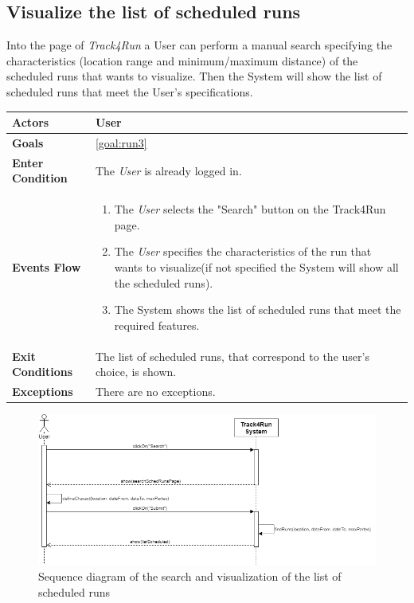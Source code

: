  \subsection{Visualize the list of scheduled runs}
Into the page of \emph{Track4Run} a User can perform a manual search specifying the characteristics (location range and minimum/maximum distance) of the scheduled runs that wants to visualize. Then the System will show the list of scheduled runs that meet the User's specifications. 

\begin{table}[H]
	\centering
    
    \begin{tabular}{|p{3.5cm}|p{10.3cm}|}
    
    \hline
    \textbf{\large{Actors}} & User	\\	 			
    \hline
    \textbf{\large{Goals}} 				& \ref{goal:run3}\\
    
    \hline
    \textbf{\large{Enter Condition}}	& The \emph{User} is already logged in.		\\
    
    \hline
    \textbf{\large{Events Flow}}		& \begin{enumerate}[leftmargin=0.5cm]
            	                            \item The \emph{User} selects the "Search" button on the Track4Run page.
                                          	\item The \emph{User} specifies the characteristics of the run that wants to visualize(if not specified the System will show all the scheduled runs).  
                                          	 \item The System shows the list of scheduled runs that meet the required features.
                                          \end{enumerate}
    										\\
    \hline
    \textbf{\large{Exit Conditions}}    & The list of scheduled runs, that correspond to the user's choice, is shown.  \\
    
    \hline
    \textbf{\large{Exceptions}} 		& There are no exceptions.\\
    
    \hline
    
    
    \end{tabular}
	
\end{table}

\begin{figure}[H]
    \centering
    \includegraphics[scale=0.4]{Pictures/visListSchedRunsSeqDiag.png}
    \caption{Sequence diagram of the search and visualization of the list of scheduled runs}
\end{figure}
